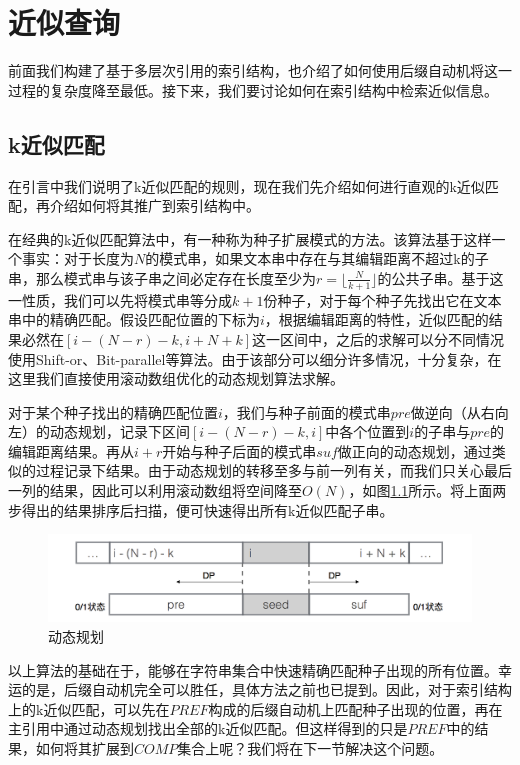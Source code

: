 ﻿\documentclass{sysuthesis}
\begin{document}
\chapter{近似查询}
前面我们构建了基于多层次引用的索引结构，也介绍了如何使用后缀自动机将这一过程的复杂度降至最低。接下来，我们要讨论如何在索引结构中检索近似信息。



\section{k近似匹配}
在引言中我们说明了k近似匹配的规则，现在我们先介绍如何进行直观的k近似匹配，再介绍如何将其推广到索引结构中。\par
在经典的k近似匹配算法\cite{baeza1992fast}中，有一种称为种子扩展模式的方法。该算法基于这样一个事实：对于长度为$N$的模式串，如果文本串中存在与其编辑距离不超过k的子串，那么模式串与该子串之间必定存在长度至少为$r = \lfloor \frac{N}{k+1} \rfloor$的公共子串。基于这一性质，我们可以先将模式串等分成$k + 1$份种子，对于每个种子先找出它在文本串中的精确匹配。假设匹配位置的下标为$i$，根据编辑距离的特性，近似匹配的结果必然在$[i - (N - r) - k, i + N + k]$这一区间中，之后的求解可以分不同情况使用Shift-or、Bit-parallel等算法。由于该部分可以细分许多情况，十分复杂，在这里我们直接使用滚动数组优化的动态规划算法求解。\par
对于某个种子找出的精确匹配位置$i$，我们与种子前面的模式串$pre$做逆向（从右向左）的动态规划，记录下区间$[i - (N - r) - k, i]$中各个位置到$i$的子串与$pre$的编辑距离结果。再从$i + r$开始与种子后面的模式串$suf$做正向的动态规划，通过类似的过程记录下结果。由于动态规划的转移至多与前一列有关，而我们只关心最后一列的结果，因此可以利用滚动数组将空间降至$O(N)$，如图\ref{image:dp}所示。将上面两步得出的结果排序后扫描，便可快速得出所有k近似匹配子串。\par

\begin{figure}[htbp]
	\centering
	\includegraphics[scale=0.35]{image/dp.png}
	\caption{动态规划}\label{image:dp}
\end{figure}

以上算法的基础在于，能够在字符串集合中快速精确匹配种子出现的所有位置。幸运的是，后缀自动机完全可以胜任，具体方法之前也已提到。因此，对于索引结构上的k近似匹配，可以先在$PREF$构成的后缀自动机上匹配种子出现的位置，再在主引用中通过动态规划找出全部的k近似匹配。但这样得到的只是$PREF$中的结果，如何将其扩展到$COMP$集合上呢？我们将在下一节解决这个问题。
\end{document}
